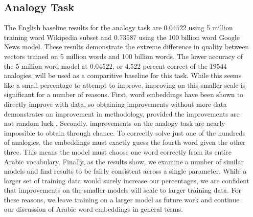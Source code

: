 





\subsection{Analogy Task}

The English baseline results for the analogy task are $0.04522$ using 5 million training word Wikipedia subset and $0.73587$ using the 100 billion word Google News model. These results demonstrate the extreme difference in quality between vectors trained on 5 million words and 100 billion words. The lower accuracy of the 5 million word model at $0.04522$, or 4.522 percent correct of the $19544$ analogies, will be used as a comparitive baseline for this task. While this seems like a small percentage to attempt to improve, improving on this smaller scale is significant for a number of reasons. First, word embeddings have been shown to directly improve with data, so obtaining improvements without more data demonstrates an improvement in methodology, provided the improvements are not random luck \cite{mikolovdist:2013}. Secondly, improvements on the analogy task are nearly impossible to obtain through chance. To correctly solve just one of the hundreds of analogies, the embeddings must exactly guess the fourth word given the other three. This means the model must choose one word correctly from its entire Arabic vocabulary. Finally, as the results show, we examine a number of similar models and find results to be fairly consistent across a single parameter. While a larger set of training data would surely increase our percentages, we are confident that improvements on the smaller models will scale to larger training data. For these reasons, we leave training on a larger model as future work and continue our discussion of Arabic word embeddings in general terms.

